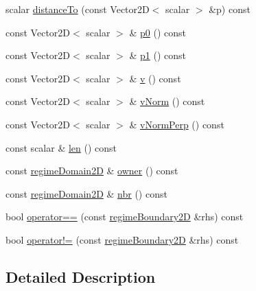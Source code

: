 \begin{DoxyCompactItemize}
\item 
scalar \hyperlink{classFoam_1_1regimeMapModels_1_1regimeBoundary2D_a03879b1609655145a0336bd9a38b9738}{distance\+To} (const Vector2D$<$ scalar $>$ \&p) const
\item 
const Vector2D$<$ scalar $>$ \& \hyperlink{classFoam_1_1regimeMapModels_1_1regimeBoundary2D_a4cc2ff4d271f5aebc1ee378b3c359b4a}{p0} () const
\item 
const Vector2D$<$ scalar $>$ \& \hyperlink{classFoam_1_1regimeMapModels_1_1regimeBoundary2D_a8b9049fe15035fbf38b52c98561bf055}{p1} () const
\item 
const Vector2D$<$ scalar $>$ \& \hyperlink{classFoam_1_1regimeMapModels_1_1regimeBoundary2D_a2be12955f05c95018bbee9df417637d7}{v} () const
\item 
const Vector2D$<$ scalar $>$ \& \hyperlink{classFoam_1_1regimeMapModels_1_1regimeBoundary2D_ac10a90d3e0235c2786119a180e7fcaf8}{v\+Norm} () const
\item 
const Vector2D$<$ scalar $>$ \& \hyperlink{classFoam_1_1regimeMapModels_1_1regimeBoundary2D_af80fc3c32f40c5c4c4542cbbe305acae}{v\+Norm\+Perp} () const
\item 
const scalar \& \hyperlink{classFoam_1_1regimeMapModels_1_1regimeBoundary2D_a741a5854926518d294d499b7590d4c02}{len} () const
\item 
const \hyperlink{classFoam_1_1regimeMapModels_1_1regimeDomain2D}{regime\+Domain2D} \& \hyperlink{classFoam_1_1regimeMapModels_1_1regimeBoundary2D_a70f1d293a30d911e12e9fac6d2564018}{owner} () const
\item 
const \hyperlink{classFoam_1_1regimeMapModels_1_1regimeDomain2D}{regime\+Domain2D} \& \hyperlink{classFoam_1_1regimeMapModels_1_1regimeBoundary2D_acc6bbd0fa6b83bf723981af33e2edc6c}{nbr} () const
\item 
bool \hyperlink{classFoam_1_1regimeMapModels_1_1regimeBoundary2D_a0e9b581518bff0f803f15226efa2770f}{operator==} (const \hyperlink{classFoam_1_1regimeMapModels_1_1regimeBoundary2D}{regime\+Boundary2D} \&rhs) const
\item 
bool \hyperlink{classFoam_1_1regimeMapModels_1_1regimeBoundary2D_a250a9e4d16cf87bb331808ffb10f62f3}{operator!=} (const \hyperlink{classFoam_1_1regimeMapModels_1_1regimeBoundary2D}{regime\+Boundary2D} \&rhs) const
\end{DoxyCompactItemize}


\subsection{Detailed Description}


